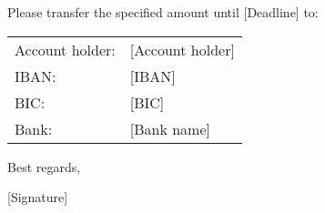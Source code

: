 \documentclass[fontsize=11pt,parskip=half]{scrartcl}
\newcommand*{\MySignatureName}{[Signature]\xspace} %
\newcommand*{\MyAccountHolder}{[Account holder]\xspace}
\newcommand*{\MyIBAN}{[IBAN]\xspace}
\newcommand*{\MyBIC}{[BIC]\xspace}
\newcommand*{\MyBank}{[Bank name]\xspace}
\newcommand*{\DeadlineDate}{[Deadline]\xspace}
\newcommand*{\VSpace}{1em}
\newcommand*{\Vspace}{0.25em}
\begin{document}
	Please transfer the specified amount until \DeadlineDate to:
	\vspace{\Vspace}

	\def\arraystretch{1.0}
	\begin{tabularx}{\textwidth}{@{}ll}
    		Account holder: & \MyAccountHolder \\
    		IBAN: & \MyIBAN\\
   		BIC: & \MyBIC\\
    		Bank: & \MyBank\\
	\end{tabularx}
	\vspace{\Vspace}

	Best regards,
	\vspace{\VSpace}

	\MySignatureName
\end{document}
